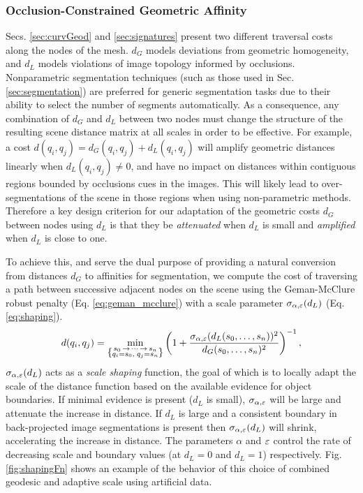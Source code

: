\subsubsection{Occlusion-Constrained Geometric Affinity}\label{sec:adaptiveGeo}
Secs. \ref{sec:curvGeod} and \ref{sec:signatures} present two different traversal costs along the nodes of the mesh.
$d_G$ models deviations from geometric homogeneity, and $d_L$ models violations of image topology informed by occlusions.
Nonparametric segmentation techniques (such as those used in Sec. \ref{sec:segmentation}) are preferred for generic segmentation
tasks due to their ability to select the number of segments automatically. As a consequence, any combination of $d_G$ and $d_L$ between
two nodes must change the structure of the resulting scene distance matrix at all scales in order to be effective. For example, a cost $d(q_i, q_j) = d_G(q_i, q_j)+d_L(q_i, q_j)$ will amplify geometric distances linearly when $d_L(q_i, q_j) \neq 0$, and have no impact on distances within
contiguous regions bounded by occlusions cues in the images. This will likely lead to over-segmentations of the scene in those regions when using non-parametric methods. 
Therefore a key design criterion for our adaptation of the geometric costs $d_G$ between nodes using $d_L$ is that they be \emph{attenuated} when $d_L$ is small and \emph{amplified} when $d_L$ is close to one.

To achieve this, and serve the dual purpose of providing a natural conversion from distances $d_G$ to affinities for segmentation, we compute the cost of traversing a path between successive adjacent nodes on the scene using the Geman-McClure robust penalty (Eq. \ref{eq:geman_mcclure}) with a scale parameter $\sigma_{\alpha,\varepsilon}(d_L)$ (Eq. \ref{eq:shaping}).
\begin{equation}
d(q_i, q_j) = \min_{\left\{\substack{s_0\,\rightarrow\,\cdots\,\rightarrow\,s_n\\ q_i=s_0,\;q_j=s_n}\right\}}
\left(1+\frac{\sigma_{\alpha,\varepsilon} (d_L(s_0,\ldots,s_n))^2}{d_G(s_0,\ldots,s_n)^2}\right)^{-1},
\label{eq:geman_mcclure}
\end{equation}
$\sigma_{\alpha,\varepsilon}(d_L)$ acts as a \emph{scale shaping} function, the goal of which is to locally adapt the scale of the distance function based on
the available evidence for object boundaries. If minimal evidence is present ($d_L$ is small),
$\sigma_{\alpha,\varepsilon}$ will be large and attenuate the increase in distance. If $d_L$ is large and
a consistent boundary in back-projected image segmentations is present then $\sigma_{\alpha,\varepsilon}(d_L)$
will shrink, accelerating the increase in distance. The parameters $\alpha$ and $\varepsilon$ control the rate of decreasing scale and boundary values (at $d_L=0$ and $d_L=1$) respectively. Fig. \ref{fig:shapingFn} shows an example of the behavior of this choice of combined geodesic and adaptive scale using artificial data.

